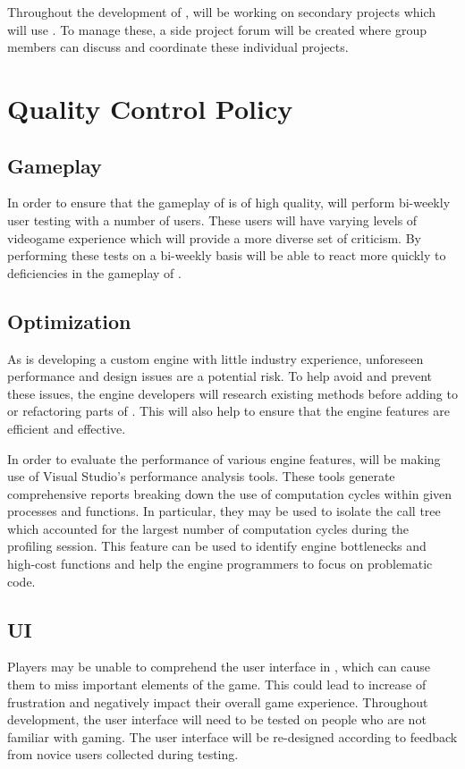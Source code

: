 \documentclass{GlobalDocument}
\begin{document}
Throughout the development of \ourgame{}, \ourteam{} will be working on secondary projects which will use \ourengine{}. To manage these, a side project forum will be created where group members can discuss and coordinate these individual projects.

\chapter{Quality Control Policy}
\section{Gameplay}
In order to ensure that the gameplay of \ourgame{} is of high quality, \ourteam{} will perform bi-weekly user testing with a number of users. These users will have varying levels of videogame experience which will provide a more diverse set of criticism. By performing these tests on a bi-weekly basis \ourteam{} will be able to react more quickly to deficiencies in the gameplay of \ourgame{}. 



\section{Optimization}
As \ourteam{} is developing a custom engine with little industry experience, unforeseen performance and design issues are a potential risk. To help avoid and prevent these issues, the engine developers will research existing methods before adding to or refactoring parts of \ourengine{}. This will also help to ensure that the engine features are efficient and effective. 

In order to evaluate the performance of various engine features, \ourteam{} will be making use of Visual Studio's performance analysis tools. These tools generate comprehensive reports breaking down the use of computation cycles within given processes and functions. In particular, they may be used to isolate the call tree which accounted for the largest number of computation cycles during the profiling session. This feature can be used to identify engine bottlenecks and high-cost functions and help the engine programmers to focus on problematic code.

\section{UI}
Players may be unable to comprehend the user interface in \ourgame{}, which can cause them to miss important elements of the game. This could lead to increase of frustration and negatively impact their overall game experience. Throughout development, the user interface will need to be tested on people who are not familiar with gaming. The user interface will be re-designed according to feedback from novice users collected during testing.
\end{document}
